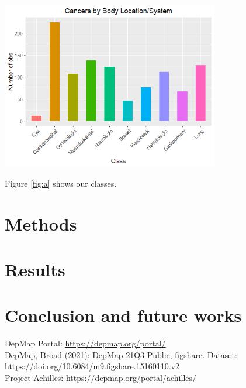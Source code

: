 \documentclass[a4paper,11pt, oneside]{article}  %
\begin{document}
\includegraphics[width=9.5cm]{Rplot-classes.png}
\label{fig:a}

Figure \ref{fig:a} shows our classes.

\section{Methods}


\section{Results}



\section{Conclusion and future works}


\begin{thebibliography}{11}   %
 DepMap Portal: \url{https://depmap.org/portal/}  \\
 DepMap, Broad (2021): DepMap 21Q3 Public, figshare. Dataset: \url{https://doi.org/10.6084/m9.figshare.15160110.v2} \\
 Project Achilles: \url{https://depmap.org/portal/achilles/}  \\
\end{thebibliography}
\end{document}

